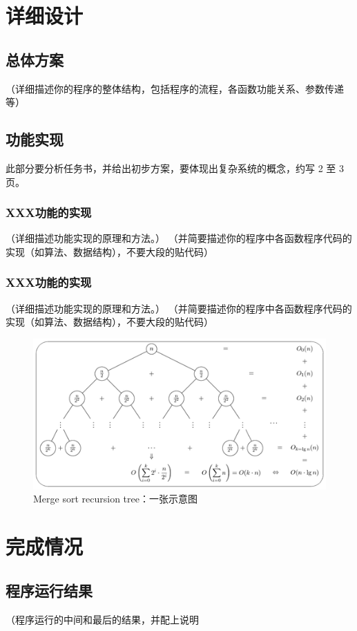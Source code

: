 \documentclass[UTF8,AutoFakeBold,AutoFakeSlant,zihao=-4]{ctexart}
\begin{document}
\section{详细设计}
\subsection{总体方案}
（详细描述你的程序的整体结构，包括程序的流程，各函数功能关系、参数传递等）

\subsection{功能实现}
此部分要分析任务书，并给出初步方案，要体现出复杂系统的概念，约写 2 至 3 页。

\subsubsection{XXX功能的实现}
（详细描述功能实现的原理和方法。）
（并简要描述你的程序中各函数程序代码的实现（如算法、数据结构），不要大段的贴代码）

\subsubsection{XXX功能的实现}
（详细描述功能实现的原理和方法。）
（并简要描述你的程序中各函数程序代码的实现（如算法、数据结构），不要大段的贴代码）

\begin{figure}[!ht]
  \centering
  \includegraphics[width=0.6\linewidth]{merge-sort-recursion-tree}
  \caption{Merge sort recursion tree：一张示意图}
  \label{fig:mergesort}
\end{figure}



\section{完成情况}

\subsection{程序运行结果}
（程序运行的中间和最后的结果，并配上说明
\end{document}
